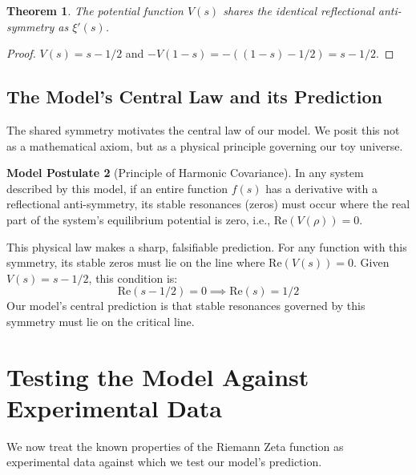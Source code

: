\documentclass{article}
\theoremstyle{plain}
\newtheorem{theorem}{Theorem}[section]
\theoremstyle{definition}
\newtheorem{modelpostulate}[theorem]{Model Postulate}
\theoremstyle{remark}
\begin{document}
\begin{theorem}
The potential function $V(s)$ shares the identical reflectional anti-symmetry as $\xi'(s)$.
\end{theorem}
\begin{proof}
$V(s) = s-1/2$ and $-V(1-s) = -((1-s)-1/2) = s-1/2$.
\end{proof}

\subsection{The Model's Central Law and its Prediction}
The shared symmetry motivates the central law of our model. We posit this not as a mathematical axiom, but as a physical principle governing our toy universe.

\begin{modelpostulate}[Principle of Harmonic Covariance]
In any system described by this model, if an entire function $f(s)$ has a derivative with a reflectional anti-symmetry, its stable resonances (zeros) must occur where the real part of the system's equilibrium potential is zero, i.e., $\mathrm{Re}(V(\rho))=0$.
\end{modelpostulate}

This physical law makes a sharp, falsifiable prediction. For any function with this symmetry, its stable zeros must lie on the line where $\text{Re}(V(s))=0$. Given $V(s)=s-1/2$, this condition is:
$$ \text{Re}(s - 1/2) = 0 \implies \text{Re}(s) = 1/2 $$
Our model's central prediction is that stable resonances governed by this symmetry must lie on the critical line.

\section{Testing the Model Against Experimental Data}
We now treat the known properties of the Riemann Zeta function as experimental data against which we test our model's prediction.
\end{document}
